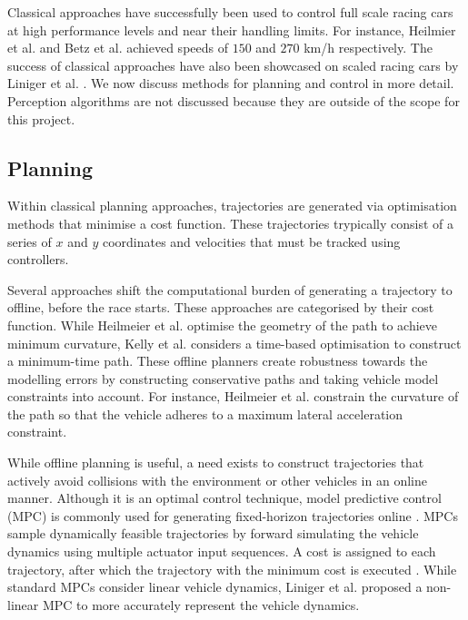 Classical approaches have successfully been used to control full scale racing cars \cite{Valls2018, alvarez2022, Nekkah2020} at high performance levels and near their handling limits.
For instance, Heilmier et al. \cite{Heilmeier2020} and
Betz et al. \cite{Betz_2023} achieved speeds of $150$ and $270$ km/h respectively.
The success of classical approaches have also been showcased on scaled racing cars by Liniger et al. \cite{Liniger2015}.
We now discuss methods for planning and control in more detail.
Perception algorithms are not discussed because they are outside of the scope for this project.

\subsection{Planning}\label{sec:trajectory_planning}
Within classical planning approaches, trajectories are generated via optimisation methods that minimise a cost function.
These trajectories trypically consist of a series of $x$ and $y$ coordinates and velocities that must be tracked using controllers.

Several approaches \cite{Heilmeier2020, Kelly2010, Herrmann2019} shift the computational burden of generating a trajectory to offline, before the race starts.
These approaches are categorised by their cost function.
While Heilmeier et al. \cite{Heilmeier2020} optimise the geometry of the path to achieve minimum curvature, Kelly et al. \cite{Kelly2010} considers a time-based optimisation to construct a minimum-time path.
These offline planners create robustness towards the modelling errors by constructing conservative paths and taking vehicle model constraints into account.
For instance, Heilmeier et al. \cite{Heilmeier2020} constrain the curvature of the path so that the vehicle adheres to a maximum lateral acceleration constraint.

While offline planning is useful, a need exists to construct trajectories that actively avoid collisions with the environment or other vehicles in an online manner.
Although it is an optimal control technique, model predictive control (MPC) is commonly used for generating fixed-horizon trajectories online \cite{Liniger2015, Liniger2015a, Anderson2016, Funke2017}.
MPCs sample dynamically feasible trajectories by forward simulating the vehicle dynamics using multiple actuator input sequences.
A cost is assigned to each trajectory, after which the trajectory with the minimum cost is executed \cite{Betz2021}. 
While standard MPCs consider linear vehicle dynamics, Liniger et al. \cite{Liniger2015} proposed a non-linear MPC to more accurately represent the vehicle dynamics.

